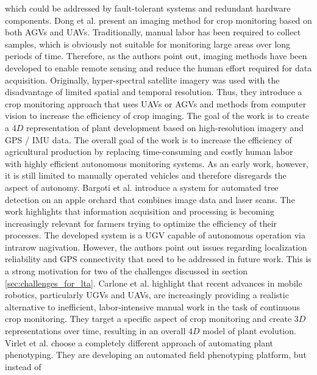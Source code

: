 \documentclass[english, master, utf8]{base/thesis_KBS}
\begin{document}
which could be addressed by fault-tolerant systems and redundant hardware components. \cite{Dunbabin:2012}\newline
Dong et al. \cite{Dong:2014} present an imaging method for crop monitoring based on both AGVs and UAVs. Traditionally, manual labor has been required to collect samples, which is
obviously not suitable for monitoring large areas over long periods of time. \cite{Dong:2014} Therefore, as the authors point out, imaging methods have been developed to enable
remote sensing and reduce the human effort required for data acquisition. Originally, hyper-spectral satellite imagery was used with the disadvantage of limited spatial and temporal
resolution. \cite{Dong:2014} Thus, they introduce a crop monitoring approach that uses UAVs or AGVs and methods from computer vision to increase the efficiency of crop imaging.
The goal of the work is to create a $4D$ representation of plant development based on high-resolution imagery and GPS / IMU data. The overall goal of the work is to increase the
efficiency of agricultural production by replacing time-consuming and costly human labor with highly efficient autonomous monitoring systems.
As an early work, however, it is still limited to manually operated vehicles and therefore disregards the aspect of autonomy.\newline
Bargoti et al. \cite{Bargoti:2015} introduce a system for automated tree detection on an apple orchard that combines image data and laser scans. The work highlights that information
acquisition and processing is becoming increasingly relevant for farmers trying to optimize the efficiency of their processes. The developed system is a UGV capable of autonomous
operation via intrarow nagivation. However, the authors point out issues regarding localization reliability and GPS connectivity that need to be addressed in future work.
This is a strong motivation for two of the challenges discussed in section \ref{sec:challenges_for_lta}.\newline
Carlone et al. \cite{Carlone:2015} highlight that recent advances in mobile robotics, particularly UGVs and UAVs, are increasingly providing a realistic alternative to
inefficient, labor-intensive manual work in the task of continuous crop monitoring. They target a specific aspect of crop monitoring and create $3D$ representations over time,
resulting in an overall $4D$ model of plant evolution. \newline
Virlet et al. \cite{Virlet:2016} choose a completely different approach of automating plant phenotyping. They are developing an automated field phenotyping platform, but instead of
\end{document}
